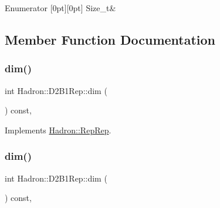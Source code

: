\begin{DoxyEnumFields}{Enumerator}
[0pt][0pt]{}\mbox{\label{structHadron_1_1D2B1Rep_afadfcc47acd228c695734e2072d61aeea22229082d3e3653bbe3ecaa33375222a}} 
Size\+\_\+t&\\
\hline

\end{DoxyEnumFields}


\subsection{Member Function Documentation}
\mbox{\label{structHadron_1_1D2B1Rep_a73998a327da6c56b3478b3e356d512d8}} 
\subsubsection{\texorpdfstring{dim()}{dim()}\hspace{0.1cm}{\footnotesize\ttfamily [1/3]}}
{\footnotesize\ttfamily int Hadron\+::\+D2\+B1\+Rep\+::dim (\begin{DoxyParamCaption}{ }\end{DoxyParamCaption}) const\hspace{0.3cm}{\ttfamily [inline]}, {\ttfamily [virtual]}}



Implements \mbox{\hyperlink{structHadron_1_1RepRep_a92c8802e5ed7afd7da43ccfd5b7cd92b}{Hadron\+::\+Rep\+Rep}}.

\mbox{\label{structHadron_1_1D2B1Rep_a73998a327da6c56b3478b3e356d512d8}} 
\subsubsection{\texorpdfstring{dim()}{dim()}\hspace{0.1cm}{\footnotesize\ttfamily [2/3]}}
{\footnotesize\ttfamily int Hadron\+::\+D2\+B1\+Rep\+::dim (\begin{DoxyParamCaption}{ }\end{DoxyParamCaption}) const\hspace{0.3cm}{\ttfamily [inline]}, {\ttfamily [virtual]}}



